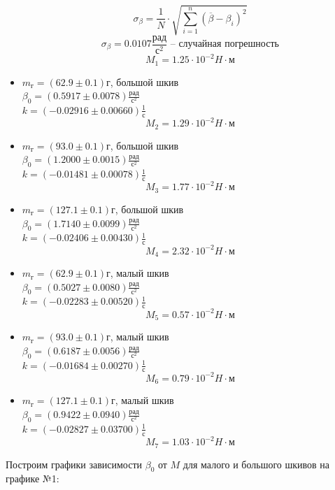 \documentclass[a4paper,12pt]{article} %
\begin{document}
\begin{itemize}
\[\sigma_{\beta} = \frac{1}{N}\cdot\sqrt{\sum_{i = 1}^{n}(\overline{\beta}-\beta_i)^2}\]
\[\sigma_{\beta} = 0.0107\frac{\text{рад}}{\text{с}^2}\text{ -- случайная погрешность}\]
\[M_1 = 1.25\cdot10^{-2}H\cdot\text{м}\]
\item $m_{\text{г}} = (62.9\pm0.1)\text{г}$, большой шкив\\
$\beta_0 = (0.5917\pm0.0078)\frac{\text{рад}}{\text{с}^2}$\\
$k = (-0.02916\pm0.00660)\frac{1}{\text{с}}$
\[M_2 = 1.29\cdot10^{-2}H\cdot\text{м}\]
\item $m_{\text{г}} = (93.0\pm0.1)\text{г}$, большой шкив\\
$\beta_0 = (1.2000\pm0.0015)\frac{\text{рад}}{\text{с}^2}$\\
$k = (-0.01481\pm0.00078)\frac{1}{\text{с}}$
\[M_3 = 1.77\cdot10^{-2}H\cdot\text{м}\]
\item $m_{\text{г}} = (127.1\pm0.1)\text{г}$, большой шкив\\
$\beta_0 = (1.7140\pm0.0099)\frac{\text{рад}}{\text{с}^2}$\\
$k = (-0.02406\pm0.00430)\frac{1}{\text{с}}$
\[M_4 = 2.32\cdot10^{-2}H\cdot\text{м}\]
\item $m_{\text{г}} = (62.9\pm0.1)\text{г}$, малый шкив\\
$\beta_0 = (0.5027\pm0.0080)\frac{\text{рад}}{\text{с}^2}$\\
$k = (-0.02283\pm0.00520)\frac{1}{\text{с}}$
\[M_5 = 0.57\cdot10^{-2}H\cdot\text{м}\]
\item $m_{\text{г}} = (93.0\pm0.1)\text{г}$, малый шкив\\
$\beta_0 = (0.6187\pm0.0056)\frac{\text{рад}}{\text{с}^2}$\\
$k = (-0.01684\pm0.00270)\frac{1}{\text{с}}$
\[M_6 = 0.79\cdot10^{-2}H\cdot\text{м}\]
\item $m_{\text{г}} = (127.1\pm0.1)\text{г}$, малый шкив\\
$\beta_0 = (0.9422\pm0.0940)\frac{\text{рад}}{\text{с}^2}$\\
$k = (-0.02827\pm0.03700)\frac{1}{\text{с}}$
\[M_7 = 1.03\cdot10^{-2}H\cdot\text{м}\]
\end{itemize}
Построим графики зависимости $\beta_0$ от $M$ для малого и большого шкивов на графике №1:
\end{document}
